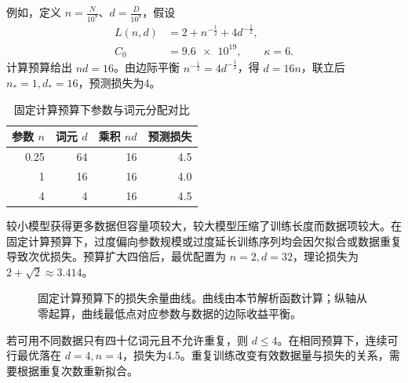 \documentclass[../textbook.tex]{subfiles}
\begin{document}
\begin{example}[计算预算下的参数与数据分配]


例如，定义 $n=\frac{N}{10^9}$、$d=\frac{D}{10^9}$，假设
\begin{equation*}
\begin{aligned}
 L(n,d) &= 2+n^{-\frac{1}{2}}+4d^{-\frac{1}{2}}, \\
 C_0 &= \num{9.6e19}, \qquad \kappa=6.
\end{aligned}
\end{equation*}
计算预算给出 $nd=16$。由边际平衡 $n^{-\frac{1}{2}}=4d^{-\frac{1}{2}}$，得 $d=16n$，联立后 $n_*=1,d_*=16$，预测损失为4。

\begin{table}[htbp]
\centering
\caption{固定计算预算下参数与词元分配对比}
\label{tab:isocompute-allocation}
\begin{tabular}{rrrr}
\toprule 参数 $n$ & 词元 $d$ & 乘积 $nd$ & 预测损失\\\midrule
0.25 & 64 & 16 & 4.5\\
1 & 16 & 16 & 4.0\\
4 & 4 & 16 & 4.5\\
\bottomrule
\end{tabular}
\end{table}

较小模型获得更多数据但容量项较大，较大模型压缩了训练长度而数据项较大。在固定计算预算下，过度偏向参数规模或过度延长训练序列均会因欠拟合或数据重复导致次优损失。预算扩大四倍后，最优配置为 $n=2,d=32$，理论损失为 $2+\sqrt2\approx3.414$。

\begin{figure}[htbp]
\centering
{}
\caption[固定计算预算下的损失余量曲线]{固定计算预算下的损失余量曲线。曲线由本节解析函数计算；纵轴从零起算，曲线最低点对应参数与数据的边际收益平衡。}\label{fig:pt-isocompute}
\end{figure}

若可用不同数据只有四十亿词元且不允许重复，则 $d\le4$。在相同预算下，连续可行最优落在 $d=4,n=4$，损失为4.5。重复训练改变有效数据量与损失的关系，需要根据重复次数重新拟合。
\end{example}
\end{document}
